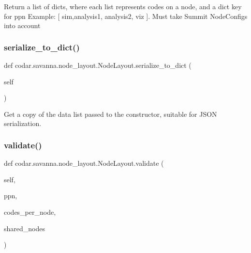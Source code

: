\begin{DoxyVerb}Return a list of dicts, where each list represents codes on a
node, and a dict key for ppn
Example: [ {sim,analysis1}, {analysis2}, {viz} ].
Must take Summit NodeConfigs into account\end{DoxyVerb}
 \mbox{\label{classcodar_1_1savanna_1_1node__layout_1_1_node_layout_ae830687f476fdcc4036f141f3caad48b}} 
\subsubsection{\texorpdfstring{serialize\+\_\+to\+\_\+dict()}{serialize\_to\_dict()}}
{\footnotesize\ttfamily def codar.\+savanna.\+node\+\_\+layout.\+Node\+Layout.\+serialize\+\_\+to\+\_\+dict (\begin{DoxyParamCaption}\item[{}]{self }\end{DoxyParamCaption})}

\begin{DoxyVerb}Get a copy of the data list passed to the constructor,
suitable for JSON serialization.\end{DoxyVerb}
 \mbox{\label{classcodar_1_1savanna_1_1node__layout_1_1_node_layout_a9b1ef6ea6e08f60a04891db7ee460990}} 
\subsubsection{\texorpdfstring{validate()}{validate()}}
{\footnotesize\ttfamily def codar.\+savanna.\+node\+\_\+layout.\+Node\+Layout.\+validate (\begin{DoxyParamCaption}\item[{}]{self,  }\item[{}]{ppn,  }\item[{}]{codes\+\_\+per\+\_\+node,  }\item[{}]{shared\+\_\+nodes }\end{DoxyParamCaption})}


